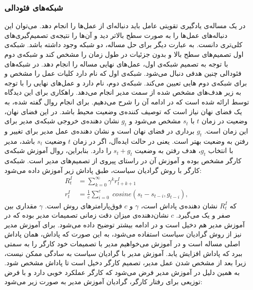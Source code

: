 \subsubsection{شبکه‌های فئودالی}
در یک مساله‌ی یادگیری تقویتی عامل باید دنباله‌ای از عمل‌ها را انجام دهد. می‌توان این دنباله‌های عمل‌ها را به صورت سطح بالاتر دید و آن‌ها را نتیجه‌ی تصمیم‌گیری‌های کلی‌تری دانست. به عبارت دیگر برای حل مساله، دو شبکه وجود داشته باشد. شبکه‌ی اول تصمیم‌های سطح بالا و بدون جزئیات در طول زمان را مشخص کند و شبکه‌ی دوم با توجه به تصمیم شبکه‌ی اول، عمل‌های نهایی مساله را انجام دهد. در شبکه‌های فئودالی چنین هدفی دنبال می‌شود.
شبکه‌ی اول که 
نام دارد کلیات عمل را مشخص و برای شبکه‌ی دوم
‌هایی تعیین می‌کند.
شبکه‌ی دوم،
نام دارد و عمل‌های نهایی را با توجه به زیر هدف‌های مشخص شده از سمت مدیر انجام می‌دهد.
راهکاری برای این دیدگاه توسط 
\cite{FeudalNet}
ارائه شده است که در ادامه آن را شرح می‌دهیم.
\newline
برای انجام روال گفته شده، به یک فضای نهان  نیاز است که توصیف کننده‌ی وضعیت محیط باشد. در این فضای نهان، وضعیت در زمان $t$ با $s_t$ مشخص می‌شود و $g_t$ نشان دهنده‌ی خروجی شبکه‌ی مدیر برای این زمان است. $g_t$ برداری در فضای نهان است و نشان دهنده‌ی عمل مدیر برای تغییر و رفتن به وضعیت بهتر است. یعنی در حالت ایده‌آل، اگر در زمان $t$ وضعیت $s_t$ باشد، مدیر با انتخاب $g_t$، هدف رفتن به وضعیت $s_t+g_t$ را دارد.
بنابراین، روال آموزش شبکه‌ی کارگر مشخص بوده و آموزش آن در  راستای  پیروی از تصمیم‌های مدیر است. شبکه‌ی کارگر با روش گرادیان سیاست، طبق پاداش زیر آموزش داده می‌شود:
\begin{equation}
\begin{split}
R_t^I &= \sum_{k=0}^\infty \gamma^k r_{t+k+1}^I \\
r_t^I &= \frac{1}{c} \sum_{i=0}^c \; cosine(s_t-s_{t-i},g_{t-i}),
\end{split}
\end{equation}
که $R_t^I$ نشان دهنده‌ی پاداش  است، $\gamma$  و $c$ فوق‌پارامتر‌های روش است.
 $\gamma$
  مقداری بین صفر و یک می‌گیرد. $c$ نشان‌دهنده‌ی میزان دقت زمانی  تصمیمات مدیر بوده که در آموزش مدیر هم دخیل است و در ادامه بیشتر توضیح داده می‌شود.
\newline
برای آموزش مدیر نیز از روش گرادیان سیاست استفاده می‌شود، به این صورت که پاداش، همان پاداش اصلی مساله است و  در آموزش می‌خواهیم مدیر با تصمیمات خود کارگر را به سمتی ببرد که پاداش افزایش یابد.
 آموزش مدیر با گرادیان سیاست به سادگی ممکن نیست، زیرا بعد  از مشخص شدن عمل مدیر، تصمیم کارگر دخیل است تا پاداش مشخص شود. به همین دلیل در آموزش مدیر فرض می‌شود که کارگر عملکرد خوبی دارد و با فرض توزیعی برای رفتار کارگر، گرادیان آموزش مدیر به صورت زیر می‌شود:
